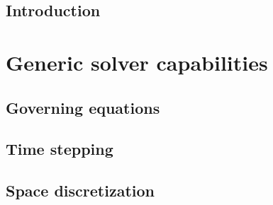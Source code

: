 \documentclass[a4paper,10pt,twoside]{csdoc}
\begin{document}
\def\contentsname{\textbf{\normalsize Table of contents}\pdfbookmark[1]{Contents}{contents}}

\renewcommand{\logocs}{cs_logo_v}

\large
\makepdgCS
\normalsize

\passepage


\passepart
\begin{center}\begin{singlespace}
\tableofcontents
\end{singlespace}\end{center}


%
\passepage

\printnomenclature
%
\chapter{Introduction}




\part{Generic solver capabilities}
\setcounter{section}{0}
\setcounter{equation}{0}
\setcounter{figure}{0}

\chapter{Governing equations}\label{chapter:goveqn}


\chapter{Time stepping}\label{chapter:timstp}


\chapter{Space discretization}\label{chapter:spadis}


\end{document}
